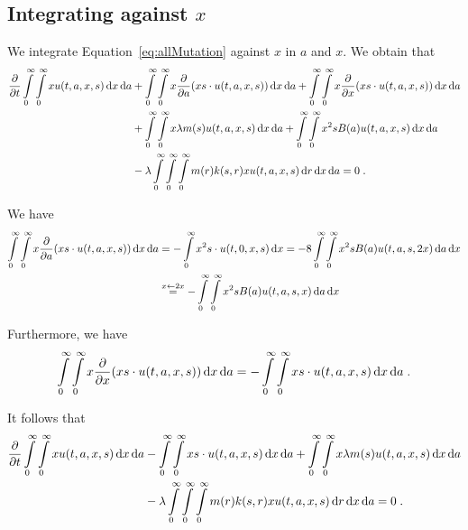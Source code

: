 \documentclass[11pt]{amsart}
\newcommand{\diff}{\,\mathrm{d}}
\begin{document}
\subsection{Integrating against $x$} We integrate Equation~\eqref{eq:allMutation} against $x$ in $a$ and $x$. We obtain that
\begin{align*}
    \partialt \int\limits_0^\infty \int\limits_0^\infty  x u(t,a,x,s) \diff x \diff a
    &+ \int\limits_0^\infty \int\limits_0^\infty x \partiala(xs \cdot  u(t,a,x,s)) \diff x \diff a
    +  \int\limits_0^\infty \int\limits_0^\infty x \partialx(xs \cdot u(t,a,x,s)) \diff x \diff a \notag\\ 
    &+ \int\limits_0^\infty \int\limits_0^\infty x \lambda m(s) u(t,a,x,s) \diff x \diff a
    +  \int\limits_0^\infty \int\limits_0^\infty x^2 s B(a) u(t,a,x,s) \diff x \diff a \\
    &
    -  \lambda \int\limits_0^\infty \int\limits_0^\infty \int\limits_0^\infty m(r) k(s,r) x u(t,a,x,s) \diff r \diff x \diff a = 0
    \eqfinp
\end{align*}

We have
\begin{align*}
    \int\limits_0^\infty \int\limits_0^\infty x \partiala(xs \cdot u(t,a,x,s)) \diff x \diff a 
    &= 
    - \int\limits_0^\infty x^2s \cdot u(t,0,x,s) \diff x 
    = 
    - 8 \int\limits_0^\infty \int\limits_0^\infty x^2s B(a) u(t,a,s,2x) \diff a \diff x \\
    &\overset{x \leftarrow 2x}{=} 
    - \int\limits_0^\infty \int\limits_0^\infty x^2s B(a) u(t,a,s,x) \diff a \diff x
\end{align*}

Furthermore, we have
\begin{align*}
    \int\limits_0^\infty \int\limits_0^\infty x \partialx(xs \cdot u(t,a,x,s)) \diff x \diff a 
    = 
    - \int\limits_0^\infty \int\limits_0^\infty xs \cdot u(t,a,x,s) \diff x \diff a 
    \eqfinp
\end{align*}

It follows that
\begin{align*}
    \partialt \int\limits_0^\infty \int\limits_0^\infty  x u(t,a,x,s) \diff x \diff a
    &
    -   \int\limits_0^\infty \int\limits_0^\infty xs \cdot u(t,a,x,s) \diff x \diff a 
    + \int\limits_0^\infty \int\limits_0^\infty x \lambda m(s) u(t,a,x,s) \diff x \diff a
    \\
    &
    -  \lambda \int\limits_0^\infty \int\limits_0^\infty \int\limits_0^\infty m(r) k(s,r) x u(t,a,x,s) \diff r \diff x \diff a = 0
    \eqfinp
\end{align*}
\end{document}
